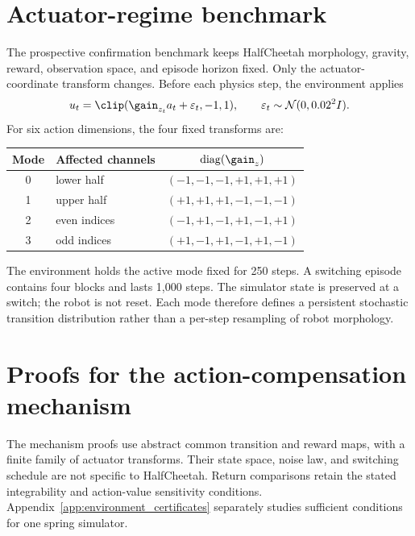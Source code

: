\clearpage
\appendix

\section{Actuator-regime benchmark}
\label{app:benchmark}

The prospective confirmation benchmark keeps HalfCheetah morphology, gravity, reward, observation space, and episode horizon fixed. Only the actuator-coordinate transform changes. Before each physics step, the environment applies
\begin{equation}
    u_t=\clip(\gain_{z_t}a_t+\varepsilon_t,-1,1),
    \qquad \varepsilon_t\sim\mathcal{N}(0,0.02^2 I).
\end{equation}
For six action dimensions, the four fixed transforms are:
\begin{center}
\begin{tabular}{clc}
\toprule
Mode & Affected channels & $\operatorname{diag}(\gain_z)$ \\
\midrule
0 & lower half & $(-1,-1,-1,+1,+1,+1)$ \\
1 & upper half & $(+1,+1,+1,-1,-1,-1)$ \\
2 & even indices & $(-1,+1,-1,+1,-1,+1)$ \\
3 & odd indices & $(+1,-1,+1,-1,+1,-1)$ \\
\bottomrule
\end{tabular}
\end{center}

The environment holds the active mode fixed for 250 steps. A switching episode contains four blocks and lasts 1,000 steps. The simulator state is preserved at a switch; the robot is not reset. Each mode therefore defines a persistent stochastic transition distribution rather than a per-step resampling of robot morphology.

\section{Proofs for the action-compensation mechanism}
\label{app:proofs}

The mechanism proofs use abstract common transition and reward maps, with a finite family of actuator transforms.
Their state space, noise law, and switching schedule are not specific to HalfCheetah.
Return comparisons retain the stated integrability and action-value sensitivity conditions.
Appendix~\ref{app:environment_certificates} separately studies sufficient conditions for one spring simulator.

